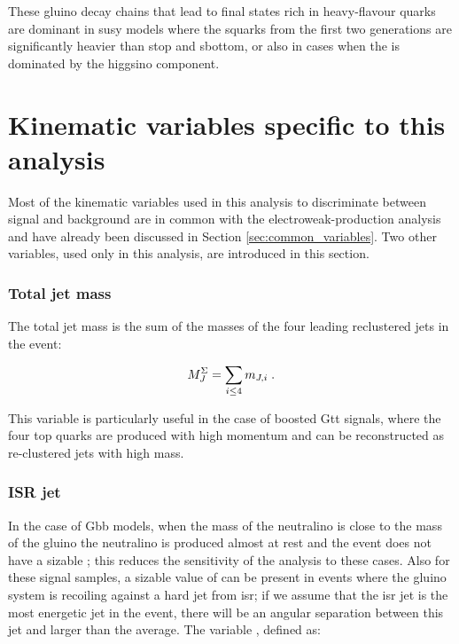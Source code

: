 These gluino decay chains that lead to final states rich in heavy-flavour quarks are dominant in \gls{susy} models where the squarks 
from the first two generations are significantly heavier than stop and sbottom, or also in cases when the \ninoone is dominated by the higgsino component. 


\section{Kinematic variables specific to this analysis}

Most of the kinematic variables used in this analysis to discriminate between signal and background 
are in common with the electroweak-production analysis and have already been discussed in Section \ref{sec:common_variables}.
Two other variables, used only in this analysis, are introduced in this section.

\subsubsection*{Total jet mass}

The total jet mass is the sum of the masses of the four leading reclustered jets in the event:

\begin{equation}
M_{J}^{\Sigma} = \sum_{i \leq 4} m_{J,i} \; .
\end{equation}

\noindent This variable is particularly useful in the case of boosted Gtt signals, where the four top quarks are produced with high momentum and can be reconstructed as re-clustered jets with high mass. 

\subsubsection*{ISR jet}

In the case of Gbb models, when the mass of the neutralino is close to the mass of the gluino the neutralino is produced almost at rest and the event does not have a sizable \met; this reduces the sensitivity of the analysis to these cases. 
Also for these signal samples, a sizable value of \met can be present in events where the gluino system is recoiling against a hard jet from \gls{isr}; if we assume that the \gls{isr} jet is the most energetic jet in the event, there will be an angular separation between this jet and \met larger than the average. The variable \dphilead, defined as:

